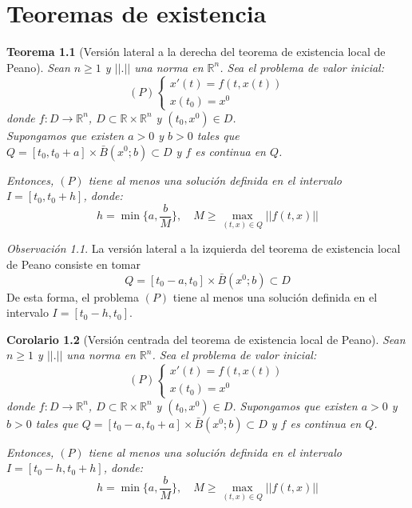 \documentclass{report}
\newtheorem{theorem}{Teorema}[chapter]
\newtheorem{corollary}[theorem]{Corolario}
\theoremstyle{remark}
\newtheorem*{remark}{Observación}
\theoremstyle{remark}
\theoremstyle{remark}
\theoremstyle{definition}
\theoremstyle{definition}
\theoremstyle{definition}
\begin{document}
\chapter{Teoremas de existencia}
\begin{theorem}[Versión lateral a la derecha del teorema de existencia local de Peano]
    Sean $n \geq 1$ y $||.||$ una norma en $\mathbb{R}^n$.
    Sea el problema de valor inicial:
    $$(P) \begin{cases}
            x'(t) = f(t, x(t)) \\
            x(t_0) = x^0
        \end{cases}$$
    donde $f: D \to \mathbb{R}^n$, $D \subset \mathbb{R} \times \mathbb{R}^n$ y $(t_0, x^0) \in D$.\\
    Supongamos que existen $a > 0$ y $b > 0$ tales que $Q = [t_0, t_0 + a] \times \bar{B}(x^0; b) \subset D$ y $f$ es continua en $Q$.

    Entonces, $(P)$ tiene al menos una solución definida en el intervalo $I = [t_0, t_0 + h]$, donde:
    $$h = \min\{a, \frac{b}{M}\}, \quad M \geq \max_{(t, x) \in Q} ||f(t, x)||$$
\end{theorem}

\begin{remark}
    La versión lateral a la izquierda del teorema de existencia local de Peano consiste en tomar
    $$Q = [t_0 - a, t_0] \times \bar{B}(x^0; b) \subset D$$
    De esta forma, el problema $(P)$ tiene al menos una solución definida en el intervalo $I = [t_0 - h, t_0]$.
\end{remark}

\begin{corollary}[Versión centrada del teorema de existencia local de Peano]
    Sean $n \geq 1$ y $||.||$ una norma en $\mathbb{R}^n$.
    Sea el problema de valor inicial:
    $$(P) \begin{cases}
            x'(t) = f(t, x(t)) \\
            x(t_0) = x^0
        \end{cases}$$
    donde $f: D \to \mathbb{R}^n$, $D \subset \mathbb{R} \times \mathbb{R}^n$ y $(t_0, x^0) \in D$.
    Supongamos que existen $a > 0$ y $b > 0$ tales que $Q = [t_0 - a, t_0 + a] \times \bar{B}(x^0; b) \subset D$ y $f$ es continua en $Q$.

    Entonces, $(P)$ tiene al menos una solución definida en el intervalo $I = [t_0 - h, t_0 + h]$, donde:
    $$h = \min\{a, \frac{b}{M}\}, \quad M \geq \max_{(t, x) \in Q} ||f(t, x)||$$
\end{corollary}
\end{document}
